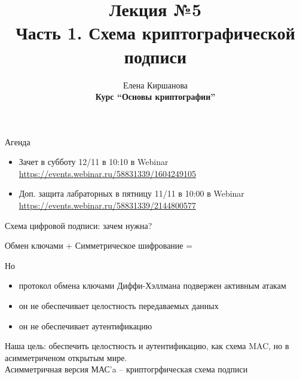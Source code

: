 \documentclass[usenames,dvipsnames,8pt,aspectratio=169]{beamer}
\title{Лекция №5 \\[10pt]
	Часть 1. Схема криптографической подписи}
\date{ Елена Киршанова \\  \textbf{Курс ``Основы криптографии''} \\  }
\begin{document}
	
\begin{frame}
	\titlepage
\end{frame}

\begin{frame}{Агенда}
	
	\Large
	\begin{itemize}
		 pt
		\item Зачет в субботу 12/11 в 10:10 в Webinar
		\url{https://events.webinar.ru/58831339/1604249105}
		\item Доп. защита лабраторных в пятницу 11/11 в 10:00 в Webinar
		\url{https://events.webinar.ru/58831339/2144800577}
	\end{itemize}
	
\end{frame}

\begin{frame}{Схема цифровой подписи: зачем нужна?}
	\large 
	\begin{center}
Обмен ключами + Симметрическое шифрование =  {\color{Orange}{конфидециальность} } 
	\end{center}
Но
	\begin{itemize}
		\itemsep 10pt
		\item протокол обмена ключами Диффи-Хэллмана {\color{Orange} подвержен активным атакам} 
		\item  он не обеспечивает {\color{Orange} целостность} передаваемых данных
		\item он не обеспечивает {\color{Orange} аутентификацию}
	\end{itemize}

\vspace{15pt}

Наша цель: обеспечить целостность и аутентификацию, как схема MAC,  но в асимметриченом  {\color{Orange} открытым} мире.\\[10pt]


\Large Асимметричная версия МАС'a -- {\color{Orange} криптогрфическая схема подписи}
\end{frame}
\end{document}
